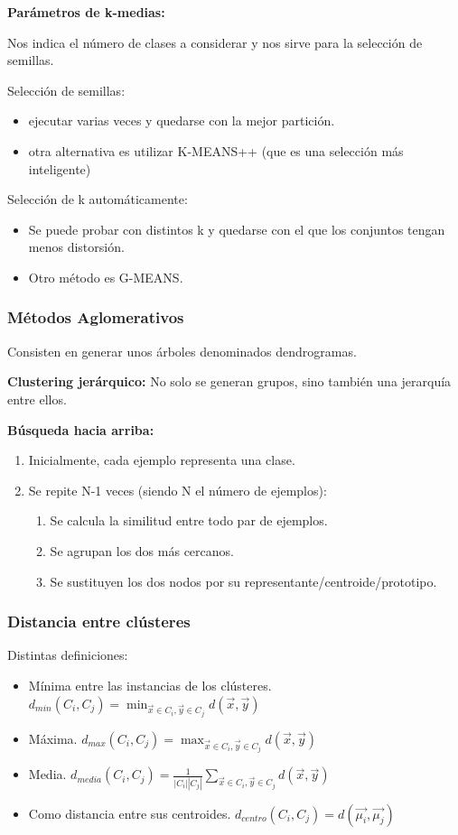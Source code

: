 \documentclass[12pt, twoside, openright]{report} %
\begin{document}
\textbf{Parámetros de k-medias:}

Nos indica el número de clases a considerar y nos sirve para la selección de semillas.

Selección de semillas:
\begin{itemize}
	\item ejecutar varias veces y quedarse con la mejor partición.
	\item otra alternativa es utilizar K-MEANS++ (que es una selección más inteligente)
\end{itemize}

Selección de k automáticamente:
\begin{itemize}
	\item Se puede probar con distintos k y quedarse con el que los conjuntos tengan menos distorsión.
	\item Otro método es G-MEANS.
\end{itemize}

\subsubsection{Métodos Aglomerativos}

Consisten en generar unos árboles denominados dendrogramas.

\textbf{Clustering jerárquico:} No solo se generan grupos, sino también una jerarquía entre ellos.

\textbf{Búsqueda hacia arriba:}
\begin{enumerate}
	\item Inicialmente, cada ejemplo representa una clase.
	\item Se repite N-1 veces (siendo N el número de ejemplos):
	      \begin{enumerate}
		      \item Se calcula la similitud entre todo par de ejemplos.
		      \item Se agrupan los dos más cercanos.
		      \item Se sustituyen los dos nodos por su representante/centroide/prototipo.
	      \end{enumerate}
\end{enumerate}

\subsubsection{Distancia entre clústeres}

Distintas definiciones:
\begin{itemize}
	\item Mínima entre las instancias de los clústeres. $d_{min}(C_i, C_j) = \min_{\vec{x} \in C_i, \vec{y} \in C_j} d(\vec{x}, \vec{y})$
	\item Máxima. $d_{max}(C_i, C_j) = \max_{\vec{x} \in C_i, \vec{y} \in C_j} d(\vec{x}, \vec{y})$
	\item Media. $d_{media}(C_i, C_j) = \frac{1}{|C_i||C_j|} \sum_{\vec{x} \in C_i, \vec{y} \in C_j} d(\vec{x}, \vec{y})$
	\item Como distancia entre sus centroides. $d_{centro}(C_i, C_j) = d(\vec{\mu_i}, \vec{\mu_j})$
\end{itemize}
\end{document}
